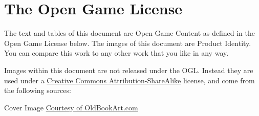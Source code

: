 \chapter{The Open Game License}
\label{Open Game License}

The text and tables of this document are Open Game Content as defined in the Open Game License below. The images of this document are Product Identity. You can compare this work to any other work that you like in any way.

Images within this document are not released under the OGL. Instead they are used under a \href{http://creativecommons.org/licenses/by-sa/3.0/}{Creative Commons Attribution-ShareAlike} license, and come from the following sources:
\begin{description*}
\item[Cover Image] \href{http://www.gallery.oldbookart.com/main.php?g2_itemId=10682}{Courtesy of OldBookArt.com}
\end{description*}


